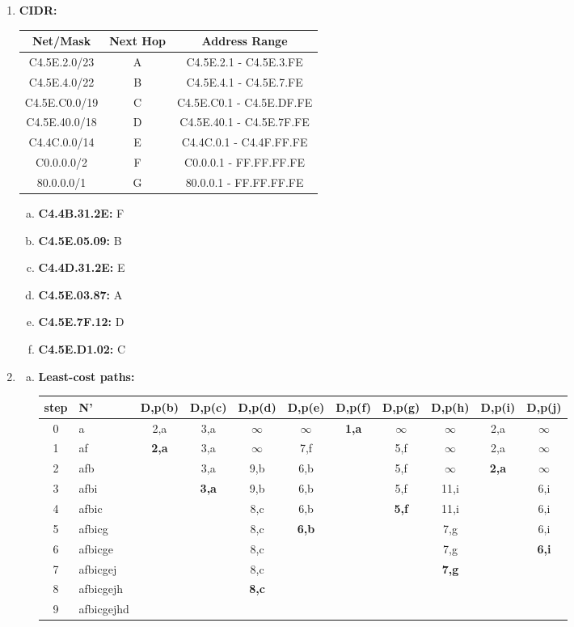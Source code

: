 \documentclass[11pt]{article}
\begin{document}
\begin{enumerate}[1.]
\item %
\textbf{
  CIDR: 
}

  \begin{tabular}{|c|c|c|}
  \hline
  Net/Mask & Next Hop & Address Range \\
  \hline
  C4.5E.2.0/23 & A & C4.5E.2.1 - C4.5E.3.FE \\
  C4.5E.4.0/22 & B & C4.5E.4.1 - C4.5E.7.FE \\
  C4.5E.C0.0/19 & C & C4.5E.C0.1 - C4.5E.DF.FE \\
  C4.5E.40.0/18 & D & C4.5E.40.1 - C4.5E.7F.FE \\
  C4.4C.0.0/14 & E & C4.4C.0.1 - C4.4F.FF.FE \\
  C0.0.0.0/2 & F & C0.0.0.1 - FF.FF.FF.FE \\
  80.0.0.0/1 & G & 80.0.0.1 - FF.FF.FF.FE \\
  \hline
  \end{tabular}
  \begin{enumerate}[(a)]
  \item \textbf{
    C4.4B.31.2E:
  } F
  \item \textbf{
    C4.5E.05.09:
  } B
  \item \textbf{
    C4.4D.31.2E:
  } E
  \item \textbf{
    C4.5E.03.87:
  } A
  \item \textbf{
    C4.5E.7F.12:
  } D
  \item \textbf{
    C4.5E.D1.02:
  } C
  \end{enumerate}
\item %

  \begin{enumerate}[(a)]
  \item
  \textbf{
    Least-cost paths:
  }

  \begin{tabular}{|c|l|c|c|c|c|c|c|c|c|c|}
    \hline
    step & N'& D,p(b) & D,p(c) & D,p(d) & D,p(e) & D,p(f) & D,p(g) & D,p(h) & D,p(i) & D,p(j) \\
    \hline
    0 & a & 2,a & 3,a & $\infty$ & $\infty$ & \textbf{1,a} & $\infty$ & $\infty$ & 2,a & $\infty$ \\
    1 & af & \textbf{2,a} & 3,a & $\infty$ & 7,f &  & 5,f & $\infty$ & 2,a & $\infty$ \\
    2 & afb &  & 3,a & 9,b & 6,b &  & 5,f & $\infty$ & \textbf{2,a} & $\infty$ \\
    3 & afbi &  & \textbf{3,a} & 9,b & 6,b &  & 5,f & 11,i &  & 6,i \\
    4 & afbic &  &  & 8,c & 6,b &  & \textbf{5,f} & 11,i &  & 6,i \\
    5 & afbicg &  &  & 8,c & \textbf{6,b} &  &  & 7,g &  & 6,i \\
    6 & afbicge &  &  & 8,c & &  &  & 7,g &  & \textbf{6,i} \\
    7 & afbicgej &  &  & 8,c & &  &  & \textbf{7,g} &  & \\
    8 & afbicgejh &  &  & \textbf{8,c} & &  &  & &  & \\
    9 & afbicgejhd &  &  & & &  &  & &  & \\
    \hline
  \end{tabular}


\end{enumerate}
\end{enumerate}
\end{document}
